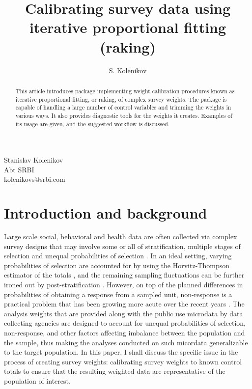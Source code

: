\author{S. Kolenikov}{%
  Stanislav Kolenikov\\Abt SRBI\\kolenikovs@srbi.com
}
\title[Raking survey data]{Calibrating survey data using iterative proportional fitting (raking)}
\maketitle

\begin{abstract}
This article introduces package  implementing weight calibration
procedures known as iterative proportional fitting,
or raking, of complex survey weights.
The package is capable of handling a large number of control
variables and trimming the weights in various ways.
It also provides diagnostic tools for the weights it creates.
Examples of its usage are given,
and the suggested workflow is discussed.

\end{abstract}

\section{Introduction and background}

Large scale social, behavioral and health data are often collected
via complex survey designs that may involve some or all of stratification,
multiple stages of selection and unequal probabilities of selection
\citep{korn:graubard:1995,korn:graubard:1999}.
In an ideal setting, varying probabilities of selection are
accounted for by using the Horvitz-Thompson estimator of the totals
\citep{horvitz:thompson:1952,thompson:1997}, and the remaining
sampling fluctuations can be further ironed out by
post-stratification \citep{holt:smith:1979}.
However, on top of the planned differences in probabilities of obtaining
a response from a sampled unit, non-response is a practical problem
that has been growing more acute over the recent years
\citep{groves:dillman:eltinge:little:2001,pew:2012}.
The analysis weights that are provided along with the public use
microdata by data collecting agencies are designed to account
for unequal probabilities of selection, non-response, and other factors 
affecting imbalance between the population and the sample, thus making 
the analyses conducted on such micordata generalizable to the target population.
In this paper, I shall discuss the specific issue in the process of creating
survey weights: 
calibrating survey weights to known control totals to ensure
that the resulting weighted data are representative of the population
of interest.

